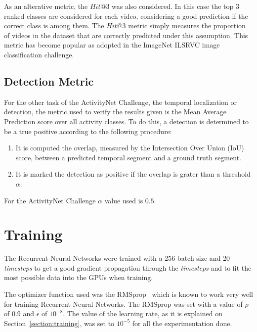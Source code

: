 As an alterative metric, the $Hit@3$ was also considered. In this case the top 3 ranked classes are considered for each video, considering a good prediction if the correct class is among them. The $Hit@3$ metric simply measures the proportion of videos in the dataset that are correctly predicted under this assumption. This metric has become popular as adopted in the ImageNet ILSRVC image classification challenge.


\subsection{Detection Metric}

For the other task of the ActivityNet Challenge, the temporal localization or detection, the metric used to verify the results given is the Mean Average Prediction score over all activity classes. To do this, a detection is determined to be a true positive according to the following procedure:
\begin{enumerate}
	\item It is computed the overlap, measured by the Intersection Over Union (IoU) score, between a predicted temporal segment and a ground truth segment.
	\item It is marked the detection as positive if the overlap is grater than a threshold $\alpha$.
\end{enumerate}
For the ActivityNet Challenge $\alpha$ value used is $0.5$.

\section{Training}

The Recurrent Neural Networks were trained with a 256 batch size and 20 \textit{timesteps} to get a good gradient propagation through the \textit{timesteps} and to fit the most possible data into the GPUs when training.

The optimizer function used was the RMSprop~\cite{dauphin2015rmsprop} which is known to work very well for training Recurrent Neural Networks. The RMSprop was set with a value of $\rho$ of 0.9 and $\epsilon$ of $10^{-8}$. The value of the learning rate, as it is explained on Section~\ref{section:training}, was set to $10^{-5}$ for all the experimentation done.


